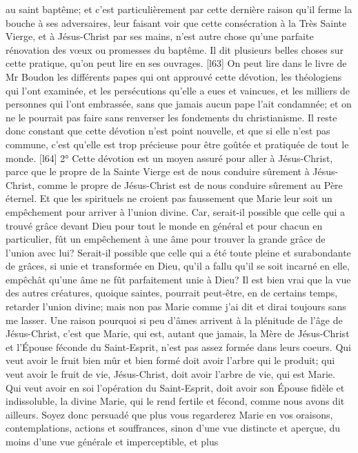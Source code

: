 au saint baptême; et c'est particulièrement par cette dernière raison qu'il ferme la bouche à ses adversaires, leur
faisant voir que cette consécration à la Très Sainte Vierge, et à Jésus-Christ par ses mains, n'est autre chose
qu'une parfaite rénovation des vœux ou promesses du baptême. Il dit plusieurs belles choses sur cette pratique,
qu'on peut lire en ses ouvrages.
[l63] On peut lire dans le livre de Mr Boudon les différents papes qui ont approuvé cette dévotion, les théologiens
qui l'ont examinée, et les persécutions qu'elle a eues et vaincues, et les milliers de personnes qui l'ont embrassée,
sans que jamais aucun pape l'ait condamnée; et on ne le pourrait pas faire sans renverser les fondements du
christianisme. Il reste donc constant que cette dévotion n'est point nouvelle, et que si elle n'est pas commune, c'est
qu'elle est trop précieuse pour être goûtée et pratiquée de tout le monde.
[l64] 2° Cette dévotion est un moyen assuré pour aller à Jésus-Christ, parce que le propre de la Sainte Vierge est
de nous conduire sûrement à Jésus-Christ, comme le propre de Jésus-Christ est de nous conduire sûrement au
Père éternel. Et que les spirituels ne croient pas faussement que Marie leur soit un empêchement pour arriver à
l'union divine. Car, serait-il possible que celle qui a trouvé grâce devant Dieu pour tout le monde en général et pour
chacun en particulier, fût un empêchement à une âme pour trouver la grande grâce de l'union avec lui? Serait-il
possible que celle qui a été toute pleine et surabondante de grâces, si unie et transformée en Dieu, qu'il a fallu qu'il
se soit incarné en elle, empêchât qu'une âme ne fût parfaitement unie à Dieu?
Il est bien vrai que la vue des autres créatures, quoique saintes, pourrait peut-être, en de certains temps, retarder
l'union divine; mais non pas Marie comme j'ai dit et dirai toujours sans me lasser. Une raison pourquoi si peu
d'âmes arrivent à la plénitude de l'âge de Jésus-Christ, c'est que Marie, qui est, autant que jamais, la Mère de
Jésus-Christ et l'Épouse féconde du Saint-Esprit, n'est pas assez formée dans leurs coeurs. Qui veut avoir le fruit
bien mûr et bien formé doit avoir l'arbre qui le produit; qui veut avoir le fruit de vie, Jésus-Christ, doit avoir l'arbre
de vie, qui est Marie. Qui veut avoir en soi l'opération du Saint-Esprit, doit avoir son Épouse fidèle et indissoluble,
la divine Marie, qui le rend fertile et fécond, comme nous avons dit ailleurs.
 Soyez donc persuadé que plus vous regarderez Marie en vos oraisons, contemplations, actions et
souffrances, sinon d'une vue distincte et aperçue, du moins d'une vue générale et imperceptible, et plus
